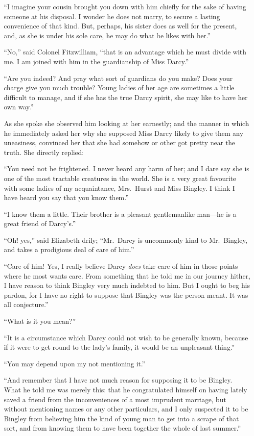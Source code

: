 ``I imagine your cousin brought you down with him chiefly for
the sake of  having someone at his disposal.  I wonder he does
not marry, to secure a lasting convenience of that kind.  But,
perhaps, his sister does as well for the present, and, as she is
under his sole care, he may do what he likes with her.''

``No,'' said Colonel Fitzwilliam, ``that is an advantage which he
must divide with me.  I am joined with him in the guardianship
of Miss Darcy.''

``Are you indeed?  And pray what sort of guardians do you
make?  Does your charge give you much trouble?  Young ladies
of her age are sometimes a little difficult to manage, and if she
has the true Darcy spirit, she may like to have her own way.''

As she spoke she observed him looking at her earnestly; and
the manner in which he immediately asked her why she supposed
Miss Darcy likely to give them any uneasiness, convinced her
that she had somehow or other got pretty near the truth.  She
directly replied:

``You need not be frightened.  I never heard any harm of her; and
I dare say she is one of the most tractable creatures in the world.
She is a very great favourite with some ladies of my acquaintance,
Mrs.\ Hurst and Miss Bingley.  I think I have heard you say that
you know them.''

``I know them a little.  Their brother is a pleasant gentlemanlike
man---he is a great friend of Darcy's.''

``Oh! yes,'' said Elizabeth drily; ``Mr.\ Darcy is uncommonly kind
to Mr.\ Bingley, and takes a prodigious deal of care of him.''

``Care of him!  Yes, I really believe Darcy \emph{does} take care of
him in those points where he most wants care.  From something
that he told me in our journey hither, I have reason to think
Bingley very much indebted to him.  But I ought to beg his
pardon, for I have no right to suppose that Bingley was the
person meant.  It was all conjecture.''

``What is it you mean?''

``It is a circumstance which Darcy could not wish to be generally
known, because if it were to get round to the lady's family, it
would be an unpleasant thing.''

``You may depend upon my not mentioning it.''

``And remember that I have not much reason for supposing it
to be Bingley.  What he told me was merely this: that he
congratulated himself on having lately saved a friend from
the inconveniences of a most imprudent marriage, but without
mentioning names or any other particulars, and I only suspected
it to be Bingley from believing him the kind of young man to get
into a scrape of that sort, and from knowing them to have been
together the whole of last summer.''

